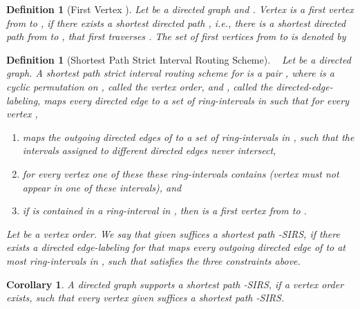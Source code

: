 \documentclass[10pt]{article}
\newtheorem{corollary}[theorem]{Corollary}
\newtheorem{definition}[theorem]{Definition}
\begin{document}
\begin{definition}[First Vertex ]\label{fe}
Let  be a directed graph and .
Vertex  is a \emph{first vertex from  to }, if there exists a shortest directed path 
, i.e., there is a shortest directed path from  to , that first traverses .
The set of first vertices from  to  is denoted by 

\end{definition}



\begin{definition}[Shortest Path Strict Interval Routing Scheme]\label{defiIRS}
~ Let  be a directed graph.
A \emph{shortest path strict interval routing scheme for } 
is a pair , where  is a cyclic permutation on , 
called the \emph{vertex order}, and , called the \emph{directed-edge-labeling}, maps 
every directed edge to a set of ring-intervals in  such that for every vertex ,
\begin{enumerate}

\item 
 maps the outgoing directed edges of  to a set of ring-intervals 
in , such that the intervals
assigned to different directed edges never intersect,

\item
for every vertex   one of these these ring-intervals 
contains  (vertex  must not appear in one of these intervals), and

\item
if  is contained in a ring-interval in , then  is a first vertex 
from  to .
\end{enumerate}

Let  be a vertex order.
We say that  \emph{ given  suffices a shortest path -SIRS}, if  
there exists a directed edge-labeling for  that maps every outgoing directed edge of  to at most 
 ring-intervals in , such that  satisfies the three constraints above.
\end{definition}



\begin{corollary}\label{coro:neu}
A directed graph  supports a 
shortest path -SIRS, if a vertex order  exists, such that every 
vertex   given  suffices a shortest path -SIRS.
\end{corollary}
\end{document}
